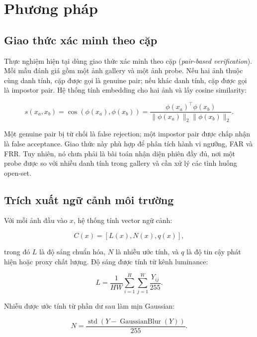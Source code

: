 \section{Phương pháp}

\subsection{Giao thức xác minh theo cặp}

Thực nghiệm hiện tại dùng giao thức xác minh theo cặp (\textit{pair-based verification}). Mỗi mẫu đánh giá gồm một ảnh gallery và một ảnh probe. Nếu hai ảnh thuộc cùng danh tính, cặp được gọi là genuine pair; nếu khác danh tính, cặp được gọi là impostor pair. Hệ thống tính embedding cho hai ảnh và lấy cosine similarity:

\begin{equation}
    s(x_a, x_b) =
    \cos\left(\phi(x_a), \phi(x_b)\right)
    =
    \frac{\phi(x_a)^\top \phi(x_b)}
    {\|\phi(x_a)\|_2 \|\phi(x_b)\|_2}.
    \label{eq:cosine}
\end{equation}

Một genuine pair bị từ chối là false rejection; một impostor pair được chấp nhận là false acceptance. Giao thức này phù hợp để phân tích hành vi ngưỡng, FAR và FRR. Tuy nhiên, nó chưa phải là bài toán nhận diện phiên đầy đủ, nơi một probe được so với nhiều danh tính trong gallery và cần xử lý các tình huống open-set.

\subsection{Trích xuất ngữ cảnh môi trường}

Với mỗi ảnh đầu vào $x$, hệ thống tính vector ngữ cảnh:

\begin{equation}
    C(x) = [L(x), N(x), q(x)],
    \label{eq:context}
\end{equation}

\noindent trong đó $L$ là độ sáng chuẩn hóa, $N$ là nhiễu ước tính, và $q$ là độ tin cậy phát hiện hoặc proxy chất lượng. Độ sáng được tính từ kênh luminance:

\begin{equation}
    L = \frac{1}{HW} \sum_{i=1}^{H}\sum_{j=1}^{W}\frac{Y_{ij}}{255}.
    \label{eq:brightness}
\end{equation}

Nhiễu được ước tính từ phần dư sau làm mịn Gaussian:

\begin{equation}
    N = \frac{\operatorname{std}(Y - \operatorname{GaussianBlur}(Y))}{255}.
    \label{eq:noise}
\end{equation}

